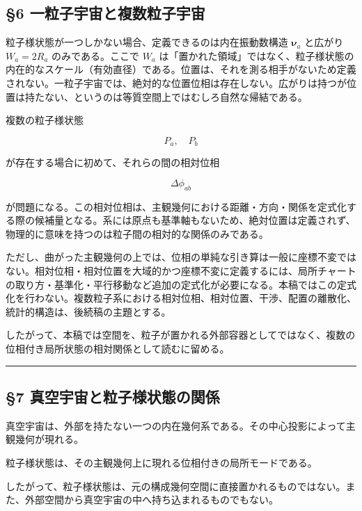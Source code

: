 \documentclass[
]{ltjsarticle}
\begin{document}
\subsection{§6
一粒子宇宙と複数粒子宇宙}\label{ux4e00ux7c92ux5b50ux5b87ux5b99ux3068ux8907ux6570ux7c92ux5b50ux5b87ux5b99}

粒子様状態が一つしかない場合、定義できるのは内在振動数構造
\(\boldsymbol{\nu}_a\) と広がり \(W_a=2R_a\) のみである。ここで \(W_a\)
は「置かれた領域」ではなく、粒子様状態の内在的なスケール（有効直径）である。位置は、それを測る相手がないため定義されない。一粒子宇宙では、絶対的な位置位相は存在しない。広がりは持つが位置は持たない、というのは等質空間上ではむしろ自然な帰結である。

複数の粒子様状態

\[P_a,\quad P_b\]

が存在する場合に初めて、それらの間の相対位相

\[\Delta\phi_{ab}\]

が問題になる。この相対位相は、主観幾何における距離・方向・関係を定式化する際の候補量となる。系には原点も基準軸もないため、絶対位置は定義されず、物理的に意味を持つのは粒子間の相対的な関係のみである。

ただし、曲がった主観幾何の上では、位相の単純な引き算は一般に座標不変ではない。相対位相・相対位置を大域的かつ座標不変に定義するには、局所チャートの取り方・基準化・平行移動など追加の定式化が必要になる。本稿ではこの定式化を行わない。複数粒子系における相対位相、相対位置、干渉、配置の離散化、統計的構造は、後続稿の主題とする。

したがって、本稿では空間を、粒子が置かれる外部容器としてではなく、複数の位相付き局所状態の相対関係として読むに留める。

\begin{center}\rule{0.5\linewidth}{0.5pt}\end{center}

\subsection{§7
真空宇宙と粒子様状態の関係}\label{ux771fux7a7aux5b87ux5b99ux3068ux7c92ux5b50ux69d8ux72b6ux614bux306eux95a2ux4fc2}

真空宇宙は、外部を持たない一つの内在幾何系である。その中心投影によって主観幾何が現れる。

粒子様状態は、その主観幾何上に現れる位相付きの局所モードである。

したがって、粒子様状態は、元の構成幾何空間に直接置かれるものではない。また、外部空間から真空宇宙の中へ持ち込まれるものでもない。
\end{document}
